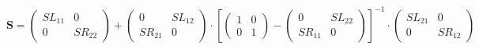 \documentclass[10pt]{article} \usepackage{amsmath} \usepackage{bbold}
\begin{document}
\[ \mathbf{S} = \left(\begin{array}{cc} SL_{11} & 0 \\ 0 & SR_{22}
\end{array}\right) + \left(\begin{array}{cc} 0 & SL_{12} \\ SR_{21} &
0 \end{array}\right) \cdot \left[ \left(\begin{array}{cc} 1 & 0 \\ 0 &
1 \end{array}\right) - \left(\begin{array}{cc} 0 & SL_{22} \\ SR_{11}
& 0 \end{array}\right) \right]^{-1} \cdot\left(\begin{array}{cc}
SL_{21} & 0 \\ 0 & SR_{12} \end{array}\right) \]
\end{document}
